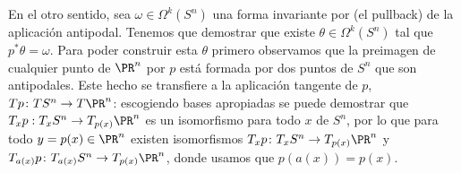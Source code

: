 \documentclass[12pt]{article}
\begin{document}
En el otro sentido, sea \( \omega \in \Omega^k(S^n) \) una forma invariante por (el
pullback) de la aplicación antipodal. Tenemos que demostrar que existe \( \theta \in
\Omega^k(S^n) \) tal que \( p^\ast \theta = \omega \). Para poder construir esta \( \theta
\) primero observamos que la preimagen de cualquier punto de \( \PR^n \) por \( p \) está
formada por dos puntos de \( S^n \) que son antipodales. Este hecho se transfiere a la
aplicación tangente de \( p \), \( Tp \colon TS^n \to T\PR^n \): escogiendo bases
apropiadas se puede demostrar que \( T_xp : T_x S^n \to T_{p(x)}\PR^n \) es un isomorfismo
para todo \( x \) de \( S^n \), por lo que para todo \( y = p(x) \in \PR^n \) existen
isomorfismos \( T_xp \colon T_xS^n \to T_{p(x)}\PR^n \) y \( T_{a(x)}p \colon T_{a(x)}S^n
\to T_{p(x)}\PR^n \), donde usamos que \( p(a(x)) = p(x) \).
\end{document}
